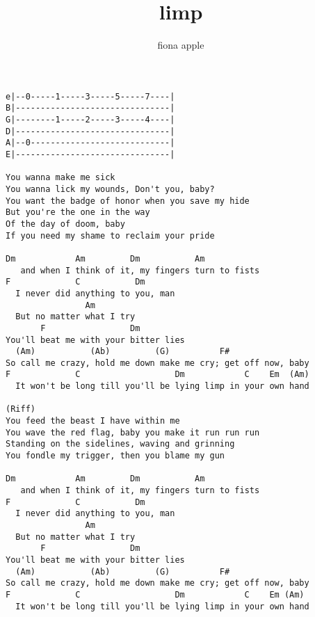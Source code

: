 \author{fiona apple}
\title{limp}
\maketitle
\begin{verbatim}
e|--0-----1-----3-----5-----7----|
B|-------------------------------|
G|--------1-----2-----3-----4----|
D|-------------------------------|
A|--0----------------------------|
E|-------------------------------|

You wanna make me sick
You wanna lick my wounds, Don't you, baby?
You want the badge of honor when you save my hide
But you're the one in the way
Of the day of doom, baby
If you need my shame to reclaim your pride

Dm            Am         Dm           Am
   and when I think of it, my fingers turn to fists
F             C           Dm
  I never did anything to you, man
                Am
  But no matter what I try
       F                 Dm
You'll beat me with your bitter lies
  (Am)           (Ab)         (G)          F#
So call me crazy, hold me down make me cry; get off now, baby
F             C                   Dm            C    Em  (Am)
  It won't be long till you'll be lying limp in your own hand

(Riff)
You feed the beast I have within me
You wave the red flag, baby you make it run run run
Standing on the sidelines, waving and grinning
You fondle my trigger, then you blame my gun

Dm            Am         Dm           Am
   and when I think of it, my fingers turn to fists
F             C           Dm
  I never did anything to you, man
                Am
  But no matter what I try
       F                 Dm
You'll beat me with your bitter lies
  (Am)           (Ab)         (G)          F#
So call me crazy, hold me down make me cry; get off now, baby
F             C                   Dm            C    Em (Am)
  It won't be long till you'll be lying limp in your own hand
\end{verbatim}